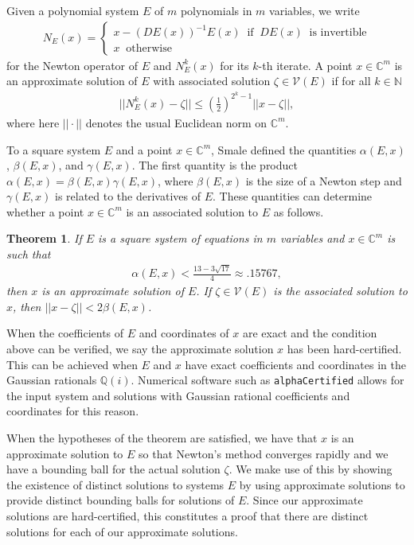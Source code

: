 \documentclass[12pt]{amsart}
\newtheorem{theorem}{Theorem}
\theoremstyle{definition}
\newcommand{\defcolor}[1]{{\color{RoyalBlue}#1}}
\begin{document}
Given a polynomial system $E$ of $m$ polynomials in $m$ variables, we write
\begin{align*}
N_{E}(x) = \begin{cases} x - (DE(x))^{-1}E(x)~\text{ if }~DE(x)~\text{ is invertible} \\
x~\text{ otherwise}
\end{cases}
\end{align*}
for the \defcolor{Newton operator} of $E$ and $N_{E}^k(x)$ for its $k$-th iterate. A point $x\in\mathbb{C}^m$ is an \defcolor{approximate solution} of $E$ with \defcolor{associated solution} $\zeta\in\mathcal{V}(E)$ if for all $k\in\mathbb{N}$
\begin{align*}
||N_{E}^k(x) - \zeta||\le \left(\frac{1}{2}\right)^{2^k - 1}||x-\zeta||,
\end{align*}
where here $||\cdot||$ denotes the usual Euclidean norm on $\mathbb{C}^m$. 

To a square system $E$ and a point $x\in\mathbb{C}^m$, Smale defined the quantities $\alpha(E,x)$, $\beta(E,x)$, and $\gamma(E,x)$. The first quantity is the product $\alpha(E,x) = \beta(E,x)\gamma(E,x)$, where $\beta(E,x)$ is the size of a Newton step and $\gamma(E,x)$ is related to the derivatives of $E$. These quantities can determine whether a point $x\in\mathbb{C}^m$ is an associated solution to $E$ as follows.
\begin{theorem}
If $E$ is a square system of equations in $m$ variables and $x\in\mathbb{C}^m$ is such that
\begin{align*}
\alpha(E,x) < \frac{13-3\sqrt{17}}{4} \approx .15767,
\end{align*}
then $x$ is an approximate solution of $E$. If $\zeta\in\mathcal{V}(E)$ is the associated solution to $x$, then $||x-\zeta||<2\beta(E,x)$. 
\end{theorem}
When the coefficients of $E$ and coordinates of $x$ are exact and the condition above can be verified, we say the approximate solution $x$ has been \defcolor{hard-certified}. This can be achieved when $E$ and $x$ have exact coefficients and coordinates in the Gaussian rationals $\mathbb{Q}(i)$. Numerical software such as \texttt{alphaCertified} \cite{alphaCertified} allows for the input system and solutions with Gaussian rational coefficients and coordinates for this reason.

When the hypotheses of the theorem are satisfied, we have that $x$ is an approximate solution to $E$ so that Newton's method converges rapidly and we have a bounding ball for the actual solution $\zeta$. We make use of this by showing the existence of distinct solutions to systems $E$ by using approximate solutions to provide distinct bounding balls for solutions of $E$. Since our approximate solutions are hard-certified, this constitutes a proof that there are distinct solutions for each of our approximate solutions.
\end{document}
